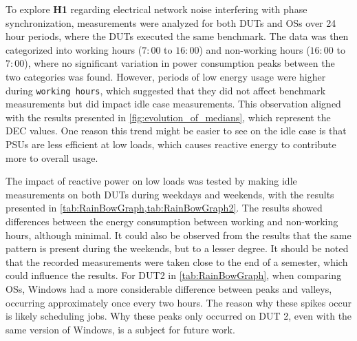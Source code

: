 
To explore \textbf{H1} regarding electrical network noise interfering with phase synchronization, measurements were analyzed for both DUTs and OSs over 24 hour periods, where the DUTs executed the same benchmark. The data was then categorized into working hours ($7:00$ to $16:00$) and non-working hours ($16:00$ to $7:00$), where no significant variation in power consumption peaks between the two categories was found. However, periods of low energy usage were higher during \texttt{working hours}, which suggested that they did not affect benchmark measurements but did impact idle case measurements. This observation aligned with the results presented in \cref{fig:evolution_of_medians}, which represent the DEC values. One reason this trend might be easier to see on the idle case is that PSUs are less efficient at low loads, which causes reactive energy to contribute more to overall usage.\cite{PowerSupply} 



The impact of reactive power on low loads was tested by making idle measurements on both DUTs during weekdays and weekends, with the results presented in  \cref{tab:RainBowGraph,tab:RainBowGraph2}. The results showed differences between the energy consumption between working and non-working hours, although minimal. It could also be observed from the results that the same pattern is present during the weekends, but to a lesser degree. It should be noted that the recorded measurements were taken close to the end of a semester, which could influence the results. For DUT2 in \cref{tab:RainBowGraph}, when comparing OSs, Windows had a more considerable difference between peaks and valleys, occurring approximately once every two hours. The reason why these spikes occur is likely scheduling jobs.%
Why these peaks only occurred on DUT 2, even with the same version of Windows, is a subject for future work. 

